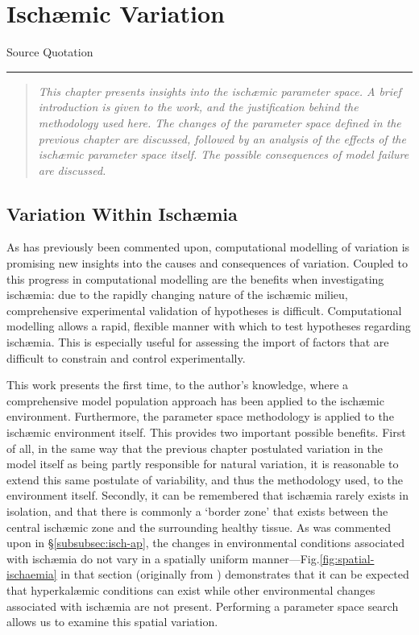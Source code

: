 \documentclass[../thesis-main.tex]{subfiles}
\begin{document}
\chapter{Isch\ae{}mic Variation}
\label{ch:ischaemia}

\begin{aquote}{Source}
  {\selectfont
   Quotation
  }
\end{aquote}
\rule{\linewidth}{0.25mm}

\begin{quote}
 \emph{This chapter presents insights into the isch\ae{}mic parameter space. A brief introduction is given to the work, and the justification behind the methodology used here. The changes of the parameter space defined in the previous chapter are discussed, followed by an analysis of the effects of the isch\ae{}mic parameter space itself. The possible consequences of model failure are discussed.}
\end{quote}

\section{Variation Within Isch\ae{}mia}
\label{sec:ischaemia-rationale}
As has previously been commented upon, computational modelling of variation is promising new insights into the causes and consequences of variation. Coupled to this progress in computational modelling are the benefits when investigating isch\ae{}mia: due to the rapidly changing nature of the isch\ae{}mic milieu, comprehensive experimental validation of hypotheses is difficult. Computational modelling allows a rapid, flexible manner with which to test hypotheses regarding isch\ae{}mia. This is especially useful for assessing the import of factors that are difficult to constrain and control experimentally.

This work presents the first time, to the author's knowledge, where a comprehensive model population approach has been applied to the isch\ae{}mic environment. Furthermore, the parameter space methodology is applied to the isch\ae{}mic environment itself. This provides two important possible benefits. First of all, in the same way that the previous chapter postulated variation in the model itself as being partly responsible for natural variation, it is reasonable to extend this same postulate of variability, and thus the methodology used, to the environment itself. Secondly, it can be remembered that isch\ae{}mia rarely exists in isolation, and that there is commonly a `border zone' that exists between the central isch\ae{}mic zone and the surrounding healthy tissue. As was commented upon in \S\ref{subsubsec:isch-ap}, the changes in environmental conditions associated with isch\ae{}mia do not vary in a spatially uniform manner---Fig.\ref{fig:spatial-ischaemia} in that section (originally from \citet{Tice2007}) demonstrates that it can be expected that hyperkal\ae{}mic conditions can exist while other environmental changes associated with isch\ae{}mia are not present. Performing a parameter space search allows us to examine this spatial variation.
\end{document}
